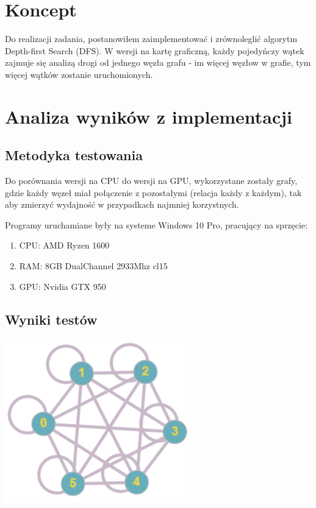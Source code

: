 \documentclass[12pt]{article}
\begin{document}
\section{Koncept}
Do realizacji zadania, postanowiłem zaimplementować i zrównoleglić algorytm Depth-first Search (DFS). W wersji na kartę graficzną, każdy pojedyńczy wątek zajmuje się analizą drogi od jednego węzła grafu - im więcej węzłow w grafie, tym więcej wątków zostanie uruchomionych.

\section{Analiza wyników z implementacji}
\subsection{Metodyka testowania}
Do porównania wersji na CPU do wersji na GPU, wykorzystane zostały grafy, gdzie każdy węzeł miał połączenie z pozostałymi (relacja każdy z każdym), tak aby zmierzyć wydajność w przypadkach najmniej korzystnych.

Programy uruchamiane były na systeme Windows 10 Pro, pracujący na sprzęcie:
\begin{enumerate}
    \item CPU: AMD Ryzen 1600
    \item RAM: 8GB DualChannel 2933Mhz cl15
    \item GPU: Nvidia GTX 950
\end{enumerate}

\subsection{Wyniki testów}

\begin{center}
\includegraphics{graph.png}
\end{center}
\end{document}
